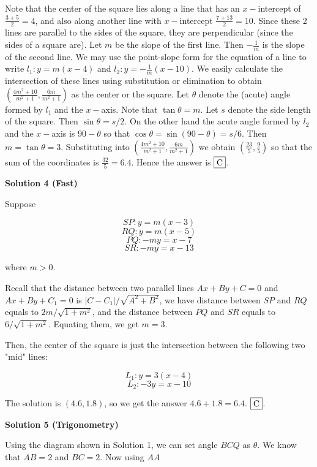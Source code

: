 \begin{enumerate}
Note that the center of the square lies along a line that has an $x-$intercept of $\frac{3+5}{2}=4$, and also along another line with $x-$intercept $\frac{7+13}{2}=10$. Since these 2 lines are parallel to the sides of the square, they are perpendicular (since the sides of a square are). Let $m$ be the slope of the first line. Then $-\frac{1}{m}$ is the slope of the second line. We may use the point-slope form for the equation of a line to write $l_1:y=m(x-4)$ and $l_2:y=-\frac{1}{m}(x-10)$. We easily calculate the intersection of these lines using substitution or elimination to obtain $\left(\frac{4m^2+10}{m^2+1},\frac{6m}{m^2+1}\right)$ as the center or the square. Let $\theta$ denote the (acute) angle formed by $l_1$ and the $x-$axis. Note that $\tan\theta=m$. Let $s$ denote the side length of the square. Then $\sin\theta=s/2$. On the other hand the acute angle formed by $l_2$ and the $x-$axis is $90-\theta$ so that $\cos\theta=\sin(90-\theta)=s/6$. Then $m=\tan\theta=3$. Substituting into $\left(\frac{4m^2+10}{m^2+1},\frac{6m}{m^2+1}\right)$ we obtain $\left(\frac{23}{5},\frac{9}{5}\right)$ so that the sum of the coordinates is $\frac{32}{5}=6.4$. Hence the answer is $\framebox{C}$.

 



\textbf{Solution 4 (Fast)}

Suppose

 
 \[SP: y=m(x-3)\]
 \[RQ: y=m(x-5)\]
 \[PQ: -my=x-7\]
 \[SR: -my=x-13\]

 where $m >0$.

 Recall that the distance between two parallel lines $Ax+By+C=0$ and $Ax+By+C_1=0$ is $|C-C_1|/\sqrt{A^2+B^2}$, we have distance between $SP$ and $RQ$ equals to $2m/\sqrt{1+m^2}$, and the distance between $PQ$ and $SR$ equals to $6/\sqrt{1+m^2}$. Equating them, we get $m=3$.

 Then, the center of the square is just the intersection between the following two "mid" lines:

 
 \[L_1: y=3(x-4)\]
 \[L_2: -3y = x-10\]

 The solution is $(4.6,1.8)$, so we get the answer $4.6+1.8=6.4$.  $\framebox{C}$.

 



\textbf{Solution 5 (Trigonometry)}

Using the diagram shown in Solution 1, we can set angle $BCQ$ as $\theta$. We know that $AB=2$ and $BC=2$. Now using $AA$


\end{enumerate}
